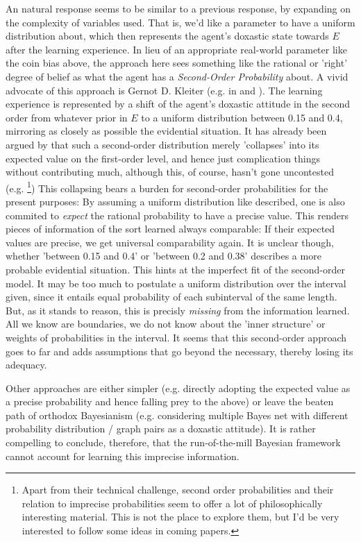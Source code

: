 \documentclass[11pt, a4paper]{scrartcl}
\begin{document}
An natural response seems to be similar to a previous response, by expanding on the complexity of variables used. That is, we'd like a parameter to have a uniform distribution about, which then represents the agent's doxastic state towards $E$ after the learning experience. In lieu of an appropriate real-world parameter like the coin bias above, the approach here sees something like the rational or 'right' degree of belief as what the agent has a \emph{Second-Order Probability} about. A vivid advocate of this approach is Gernot D. Kleiter (e.g. in \citet{KLEITER1996143} and \citet{Pfeifer2007-PFEHRW}). The learning experience is represented by a shift of the agent's doxastic attitude in the second order from whatever prior in $E$ to a uniform distribution between 0.15 and 0.4, mirroring as closely as possible the evidential situation. It has already been argued by \citet[p.58]{Savage1954-SAVTFO-2} that such a second-order distribution merely 'collapses' into its expected value on the first-order level, and hence just complication things without contributing much, although this, of course, hasn't gone uncontested (e.g. \citet{Hansson2008-HANDWN}\footnote{Apart from their technical challenge, second order probabilities and their relation to imprecise probabilities seem to offer a lot of philosophically interesting material. This is not the place to explore them, but I'd be very interested to follow some ideas in coming papers.}) This collapsing bears a burden for second-order probabilities for the present purposes: By assuming a uniform distribution like described, one is also commited to \emph{expect} the rational probability to have a precise value. This renders pieces of information of the sort learned always comparable: If their expected values are precise, we get universal comparability again. It is unclear though, whether 'between 0.15 and 0.4' or 'between 0.2 and 0.38' describes a more probable evidential situation. This hints at the imperfect fit of the second-order model. It may be too much to postulate a uniform distribution over the interval given, since it entails equal probability of each subinterval of the same length. But, as it stands to reason, this is precisly \emph{missing} from the information learned. All we know are boundaries, we do not know about the 'inner structure' or weights of probabilities in the interval. It seems that this second-order approach goes to far and adds assumptions that go beyond the necessary, thereby losing its adequacy. 

Other approaches are either simpler (e.g. directly adopting the expected value as a precise probability and hence falling prey to the above) or leave the beaten path of orthodox Bayesianism (e.g. considering multiple Bayes net with different probability distribution / graph pairs as a doxastic attitude). It is rather compelling to conclude, therefore, that the run-of-the-mill Bayesian framework cannot account for learning this imprecise information. 
\end{document}
